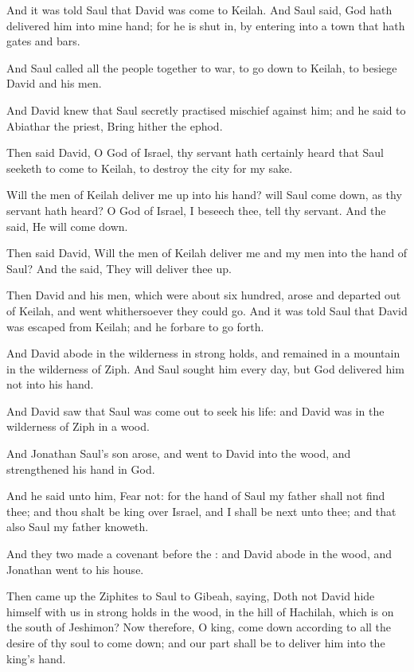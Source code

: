 \Verse And it was told Saul that David was come to Keilah. And Saul said, God hath delivered him into mine hand; for he is shut in, by entering into a town that hath gates and bars.

\Verse And Saul called all the people together to war, to go down to Keilah, to besiege David and his men.

\Verse And David knew that Saul secretly practised mischief against him; and he said to Abiathar the priest, Bring hither the ephod.

\Verse Then said David, O \LORD God of Israel, thy servant hath certainly heard that Saul seeketh to come to Keilah, to destroy the city for my sake.

\Verse Will the men of Keilah deliver me up into his hand? will Saul come down, as thy servant hath heard? O \LORD God of Israel, I beseech thee, tell thy servant. And the \LORD said, He will come down.

\Verse Then said David, Will the men of Keilah deliver me and my men into the hand of Saul? And the \LORD said, They will deliver thee up.

\Verse Then David and his men, which were about six hundred, arose and departed out of Keilah, and went whithersoever they could go. And it was told Saul that David was escaped from Keilah; and he forbare to go forth.

\Verse And David abode in the wilderness in strong holds, and remained in a mountain in the wilderness of Ziph. And Saul sought him every day, but God delivered him not into his hand.

\Verse And David saw that Saul was come out to seek his life: and David was in the wilderness of Ziph in a wood.

\Verse And Jonathan Saul's son arose, and went to David into the wood, and strengthened his hand in God.

\Verse And he said unto him, Fear not: for the hand of Saul my father shall not find thee; and thou shalt be king over Israel, and I shall be next unto thee; and that also Saul my father knoweth.

\Verse And they two made a covenant before the \LORD: and David abode in the wood, and Jonathan went to his house.

\Verse Then came up the Ziphites to Saul to Gibeah, saying, Doth not David hide himself with us in strong holds in the wood, in the hill of Hachilah, which is on the south of Jeshimon?  \Verse Now therefore, O king, come down according to all the desire of thy soul to come down; and our part shall be to deliver him into the king's hand.

